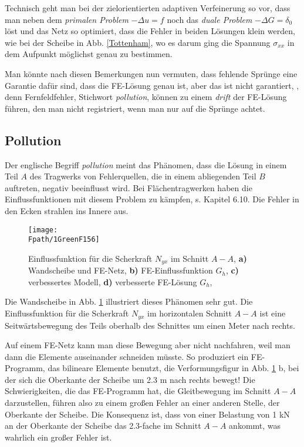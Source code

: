 {Technisch geht man bei der  zielorientierten adaptiven Verfeinerung so vor, dass man neben dem {\em primalen Problem\/} $- \Delta u = f$ noch das {\em duale Problem\/} $- \Delta G = \delta_0$ l\"{o}st und das Netz so optimiert, dass die Fehler in beiden L\"{o}sungen klein werden, wie bei der Scheibe in Abb. \ref{Tottenham}, wo es darum ging die Spannung $\sigma_{xx}$ in dem Aufpunkt m\"{o}glichst genau zu bestimmen.

Man k\"{o}nnte nach diesen Bemerkungen nun vermuten, dass fehlende Spr\"{u}nge eine Garantie daf\"{u}r sind, dass die FE-L\"{o}sung \glq genau\grq{} ist, aber das ist nicht garantiert, \cite{Ha5}, denn Fernfeldfehler, Stichwort {\em pollution\/}, k\"{o}nnen zu einem {\em drift\/} der FE-L\"{o}sung f\"{u}hren, den man nicht registriert, wenn man nur auf die Spr\"{u}nge achtet.

{\textcolor{sectionTitleBlue}{\section{Pollution}}}
Der englische Begriff {\em pollution\/} meint das Ph\"{a}nomen, dass die L\"{o}sung in einem Teil $A$ des Tragwerks von Fehlerquellen, die in einem abliegenden Teil $B$ auftreten, negativ beeinflusst wird. Bei Fl\"{a}chentragwerken haben die Einflussfunktionen mit diesem Problem zu k\"{a}mpfen, s. Kapitel 6.10. Die Fehler in den Ecken strahlen ins Innere aus.
\begin{figure}
\centering
{\texttt{[image: \\Fpath/1GreenF156]}}
\caption{Einflussfunktion f\"{u}r die Scherkraft $N_{yx}$ im Schnitt $A-A$, \textbf{ a)} Wandscheibe und FE-Netz, \textbf{ b)} FE-Einflussfunktion $G_h$, \textbf{ c)} verbessertes Modell, \textbf{ d)} verbesserte FE-L\"{o}sung $G_h$, \cite{Ha6}}
\label{1GreenF156}%
%
\end{figure}%

Die Wandscheibe in Abb. \ref{1GreenF156} illustriert dieses Ph\"{a}nomen sehr gut. Die Einflussfunktion f\"{u}r die Scherkraft $N_{yx}$ im horizontalen Schnitt $A-A$ ist eine Seitw\"{a}rtsbewegung des Teils oberhalb des Schnittes um einen Meter nach rechts.

Auf einem FE-Netz kann man diese Bewegung aber nicht nachfahren, weil man dann die Elemente auseinander schneiden m\"{u}sste. So produziert ein FE-Programm, das bilineare Elemente benutzt, die Verformungsfigur in Abb. \ref{1GreenF156} b, bei der sich die Oberkante der Scheibe um 2.3 m nach rechts bewegt! Die Schwierigkeiten, die das FE-Programm hat, die Gleitbewegung im Schnitt $A-A$ darzustellen, f\"{u}hren also zu einem gro{\ss}en Fehler an einer anderen Stelle, der Oberkante der Scheibe. Die Konsequenz ist, dass von einer Belastung von 1 kN an der Oberkante der Scheibe das 2.3-fache im Schnitt $A-A$ ankommt, was wahrlich ein gro{\ss}er Fehler ist.

}

